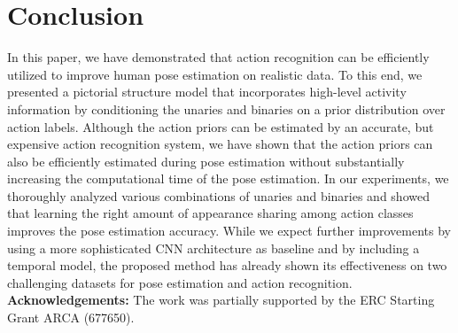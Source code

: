 \documentclass[a4paper, 10pt, conference]{ieeeconf}      \usepackage{FG2017}
\begin{document}
\section{Conclusion}

In this paper, we have demonstrated that action recognition can be efficiently utilized to improve human pose estimation on realistic data. To this end, we presented a pictorial structure model that incorporates high-level activity information 
by conditioning the unaries and binaries on a prior distribution over action labels. Although the action priors can be estimated by an accurate, but expensive action recognition system, we have shown that the action priors can also be efficiently estimated during pose estimation without substantially increasing the computational time of the pose estimation. In our experiments, we thoroughly analyzed various combinations of unaries and binaries and showed that learning the right amount of appearance sharing among action classes improves the pose estimation accuracy. While we expect further improvements by using a more sophisticated CNN architecture as baseline and by including a temporal model, the proposed method has already shown its effectiveness on two challenging datasets for pose estimation and action recognition.  \\


\noindent\textbf{Acknowledgements:} The work was partially supported by the ERC Starting Grant ARCA (677650).




\end{document}
